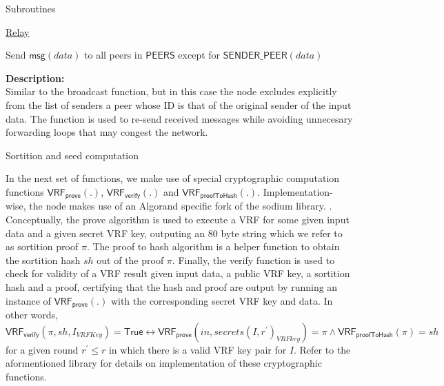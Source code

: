\documentclass[10pt,a4paper]{article}
\begin{document}
\begin{section}{Subroutines}

\begin{algorithm}[H]
    \caption{\underline{Relay}}
    \label{algo:relay}
    \begin{algorithmic}[1]

    Send $\mathsf{msg}(data)$ to all peers in $\mathsf{PEERS}$ except for $\mathsf{SENDER\_PEER}(data)$

    \EndFunction
    \end{algorithmic}
\end{algorithm}

\noindent \textbf{Description:}\\
Similar to the broadcast function, but in this case the node excludes explicitly from the list of senders
a peer whose ID is that of the original sender of the input data.
The function is used to re-send received messages while avoiding unnecesary forwarding loops 
that may congest the network.


\begin{subsection}{Sortition and seed computation}\label{sect:sort-seed}

In the next set of functions, we make use of special cryptographic computation 
functions $\mathsf{VRF_{prove}}(.)$, $\mathsf{VRF_{verify}}(.)$ and $\mathsf{VRF_{proofToHash}}(.)$.
Implementation-wise, the node makes use of an Algorand specific fork of the sodium library.
. 
Conceptually, the prove algorithm is used to execute a VRF for some given input
data and a given secret VRF key, outputing an 80 byte string which we refer to as sortition proof $\pi$. 
The proof to hash algorithm is a helper function to obtain the sortition hash $sh$ out of the proof
$\pi$. Finally, the verify function is used to check for validity of a VRF result given input data,
a public VRF key, a sortition hash and a proof, certifying that the hash and proof are output by running
an instance of $\mathsf{VRF_{prove}}(.)$ with the corresponding secret VRF key and data.
In other words, \\
$\mathsf{VRF_{verify}}(\pi, sh, I_{VRFKey}) = \mathsf{True} \leftrightarrow 
\mathsf{VRF_{prove}}(in, secrets(I,r^\prime)_{VRFkey}) = \pi \land \mathsf{VRF_{proofToHash}}(\pi) = sh$ \\
for a given round $r^\prime \leq r$ in which there is a valid VRF key pair for $I$.
Refer to the aformentioned library for details on implementation of these cryptographic functions.


\end{subsection}
\end{section}
\end{document}
